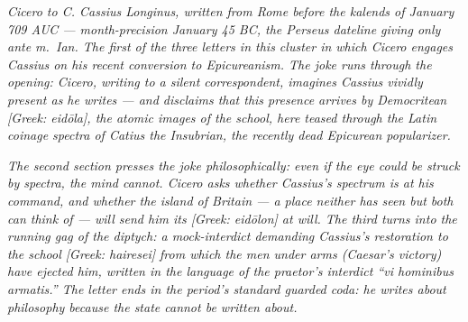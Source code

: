 
\textit{Cicero to C. Cassius Longinus, written from
Rome before the kalends of January 709 AUC ---
month-precision January 45 BC, the Perseus dateline
giving only \textit{ante m.\ Ian.} The first of the
three letters in this cluster in which Cicero engages
Cassius on his recent conversion to Epicureanism. The
joke runs through the opening: Cicero, writing to a
silent correspondent, imagines Cassius vividly present
as he writes --- and disclaims that this presence
arrives by Democritean \textit{[Greek: eidōla]}, the
atomic images of the school, here teased through the
Latin coinage \textit{spectra} of Catius the Insubrian,
the recently dead Epicurean popularizer.}

\textit{The second section presses the joke
philosophically: even if the eye could be struck by
\textit{spectra}, the mind cannot. Cicero asks whether
Cassius's \textit{spectrum} is at his command, and
whether the island of Britain --- a place neither has
seen but both can think of --- will send him its
\textit{[Greek: eidōlon]} at will. The third turns into
the running gag of the diptych: a mock-interdict
demanding Cassius's restoration to the school
\textit{[Greek: hairesei]} from which the men under
arms (Caesar's victory) have ejected him, written in
the language of the praetor's interdict ``vi hominibus
armatis.'' The letter ends in the period's standard
guarded coda: he writes about philosophy because the
state cannot be written about.}
